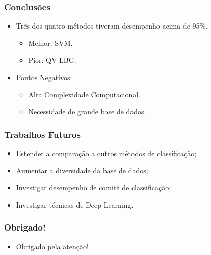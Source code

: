 \documentclass{beamer}
\begin{document}
\begin{frame}

	\frametitle{Conclusões}
	
	\begin{itemize}
		\setlength\itemsep{1em}
		
		\item Três dos quatro métodos tiveram desempenho acima de 95\%.
		\begin{itemize}
			\item Melhor: SVM.
			\item Pior: QV LBG.
		\end{itemize}
		\item Pontos Negativos:
		\begin{itemize}
			\item Alta Complexidade Computacional.
			\item Necessidade de grande base de dados.
		\end{itemize}
	\end{itemize}


\end{frame}

\begin{frame}

	\frametitle{Trabalhos Futuros}
	
	\begin{itemize}
		\setlength\itemsep{1em}
		
		\item Estender a comparação a outros métodos de classificação;
        \item Aumentar a diversidade da base de dados;
		\item Investigar desempenho de comitê de classificação;
        \item Investigar técnicas de Deep Learning.
	
	\end{itemize}


\end{frame}


\begin{frame}
	\frametitle{Obrigado!}
    
    \centering
    
    \begin{itemize}
    	\setlength\itemsep{2em}
		\item Obrigado pela atenção!
	\end{itemize}

\end{frame}
\end{document}
